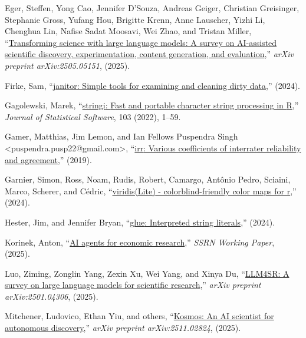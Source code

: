 \documentclass[
  11pt,
  letterpaper,
  DIV=11,
  numbers=noendperiod]{scrreprt}
\newlength{\cslhangindent}
\newenvironment{CSLReferences}[2] %
 {\begin{list}{}{%
  \setlength{\itemindent}{0pt}
  \setlength{\leftmargin}{0pt}
  \setlength{\parsep}{0pt}
  \ifodd #1
   \setlength{\leftmargin}{\cslhangindent}
   \setlength{\itemindent}{-1\cslhangindent}
  \fi
  \setlength{\itemsep}{#2\baselineskip}}}
 {\end{list}}
\begin{document}
\begin{CSLReferences}{1}{0}
Eger, Steffen, Yong Cao, Jennifer D'Souza, Andreas Geiger, Christian
Greisinger, Stephanie Gross, Yufang Hou, Brigitte Krenn, Anne Lauscher,
Yizhi Li, Chenghua Lin, Nafise Sadat Moosavi, Wei Zhao, and Tristan
Miller, {``\href{https://arxiv.org/abs/2502.05151}{Transforming science
with large language models: A survey on AI-assisted scientific
discovery, experimentation, content generation, and evaluation},''}
\emph{arXiv preprint arXiv:2505.05151}, (2025).

Firke, Sam, {``\href{https://github.com/sfirke/janitor}{{janitor}:
Simple tools for examining and cleaning dirty data},''} (2024).

Gagolewski, Marek,
{``\href{https://doi.org/10.18637/jss.v103.i02}{{stringi}: {F}ast and
portable character string processing in {R}},''} \emph{Journal of
Statistical Software}, 103 (2022), 1--59.

Gamer, Matthias, Jim Lemon, and Ian Fellows Puspendra Singh
\textless puspendra.pusp22@gmail.com\textgreater,
{``\href{https://www.r-project.org}{{irr}: Various coefficients of
interrater reliability and agreement},''} (2019).

Garnier, Simon, Ross, Noam, Rudis, Robert, Camargo, Antônio Pedro,
Sciaini, Marco, Scherer, and Cédric,
{``\href{https://doi.org/10.5281/zenodo.4679423}{{viridis(Lite)} -
colorblind-friendly color maps for r},''} (2024).

Hester, Jim, and Jennifer Bryan,
{``\href{https://glue.tidyverse.org/}{{glue}: Interpreted string
literals},''} (2024).

Korinek, Anton,
{``\href{https://papers.ssrn.com/sol3/papers.cfm?abstract_id=5455842}{AI
agents for economic research},''} \emph{SSRN Working Paper}, (2025).

Luo, Ziming, Zonglin Yang, Zexin Xu, Wei Yang, and Xinya Du,
{``\href{https://arxiv.org/abs/2501.04306}{LLM4SR: A survey on large
language models for scientific research},''} \emph{arXiv preprint
arXiv:2501.04306}, (2025).

Mitchener, Ludovico, Ethan Yiu, and others,
{``\href{https://arxiv.org/abs/2511.02824}{Kosmos: An AI scientist for
autonomous discovery},''} \emph{arXiv preprint arXiv:2511.02824},
(2025).


\end{CSLReferences}
\end{document}
